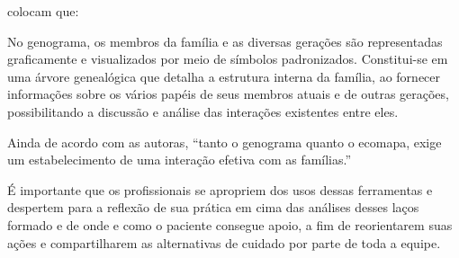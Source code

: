 \cite{gisele2013book} colocam que:

\begin{citacao}
No genograma, os membros da família e as diversas gerações são representadas graficamente e visualizados por meio de símbolos padronizados. Constitui-se em uma árvore genealógica que detalha a estrutura interna da família, ao fornecer informações sobre os vários papéis de seus membros atuais e de outras gerações, possibilitando a discussão e análise das interações existentes entre eles. \cite{gisele2013book}
\end{citacao}

Ainda de acordo com as autoras, ``tanto o genograma quanto o ecomapa, exige um estabelecimento de uma interação efetiva com as famílias.'' \cite{gisele2013book}

É importante que os profissionais se apropriem dos usos dessas ferramentas e despertem para a reflexão de sua prática em cima das análises desses laços formado e de onde e como o paciente consegue apoio, a fim de reorientarem suas ações e compartilharem as alternativas de cuidado por parte de toda a equipe.